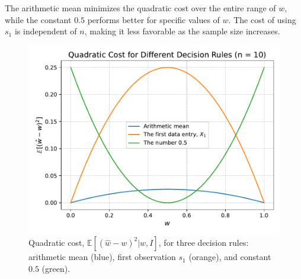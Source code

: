\begin{example}
	The arithmetic mean minimizes the quadratic cost over the entire range of $w$, while the constant $0.5$ performs better for specific values of $w$. The cost of using $s_1$ is independent of $n$, making it less favorable as the sample size increases.
	
	\begin{figure}[H]
		\captionsetup{width=1\textwidth}
		\centering
		\includegraphics[width=1\textwidth]{figures/ber_example.pdf}
		\caption{Quadratic cost, $\mathbb{E}[(\hat{w} - w)^2|w,I]$, for three decision rules: arithmetic mean (blue), first observation $s_1$ (orange), and constant $0.5$ (green).}
		\label{fig:pen}
	\end{figure}
\end{example}


